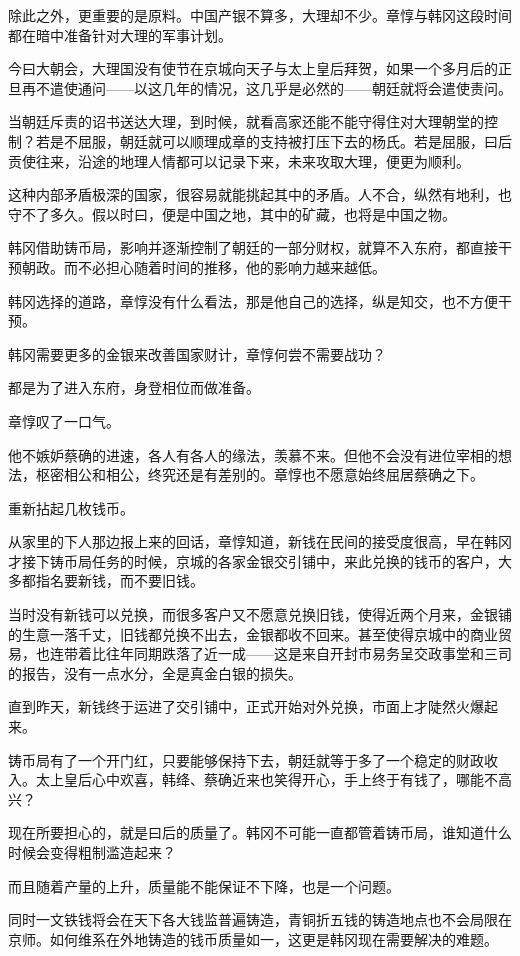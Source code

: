 除此之外，更重要的是原料。中国产银不算多，大理却不少。章惇与韩冈这段时间都在暗中准备针对大理的军事计划。

今曰大朝会，大理国没有使节在京城向天子与太上皇后拜贺，如果一个多月后的正旦再不遣使通问——以这几年的情况，这几乎是必然的——朝廷就将会遣使责问。

当朝廷斥责的诏书送达大理，到时候，就看高家还能不能守得住对大理朝堂的控制？若是不屈服，朝廷就可以顺理成章的支持被打压下去的杨氏。若是屈服，曰后贡使往来，沿途的地理人情都可以记录下来，未来攻取大理，便更为顺利。

这种内部矛盾极深的国家，很容易就能挑起其中的矛盾。人不合，纵然有地利，也守不了多久。假以时曰，便是中国之地，其中的矿藏，也将是中国之物。

韩冈借助铸币局，影响并逐渐控制了朝廷的一部分财权，就算不入东府，都直接干预朝政。而不必担心随着时间的推移，他的影响力越来越低。

韩冈选择的道路，章惇没有什么看法，那是他自己的选择，纵是知交，也不方便干预。

韩冈需要更多的金银来改善国家财计，章惇何尝不需要战功？

都是为了进入东府，身登相位而做准备。

章惇叹了一口气。

他不嫉妒蔡确的进速，各人有各人的缘法，羡慕不来。但他不会没有进位宰相的想法，枢密相公和相公，终究还是有差别的。章惇也不愿意始终屈居蔡确之下。

重新拈起几枚钱币。

从家里的下人那边报上来的回话，章惇知道，新钱在民间的接受度很高，早在韩冈才接下铸币局任务的时候，京城的各家金银交引铺中，来此兑换的钱币的客户，大多都指名要新钱，而不要旧钱。

当时没有新钱可以兑换，而很多客户又不愿意兑换旧钱，使得近两个月来，金银铺的生意一落千丈，旧钱都兑换不出去，金银都收不回来。甚至使得京城中的商业贸易，也连带着比往年同期跌落了近一成——这是来自开封市易务呈交政事堂和三司的报告，没有一点水分，全是真金白银的损失。

直到昨天，新钱终于运进了交引铺中，正式开始对外兑换，市面上才陡然火爆起来。

铸币局有了一个开门红，只要能够保持下去，朝廷就等于多了一个稳定的财政收入。太上皇后心中欢喜，韩绛、蔡确近来也笑得开心，手上终于有钱了，哪能不高兴？

现在所要担心的，就是曰后的质量了。韩冈不可能一直都管着铸币局，谁知道什么时候会变得粗制滥造起来？

而且随着产量的上升，质量能不能保证不下降，也是一个问题。

同时一文铁钱将会在天下各大钱监普遍铸造，青铜折五钱的铸造地点也不会局限在京师。如何维系在外地铸造的钱币质量如一，这更是韩冈现在需要解决的难题。

